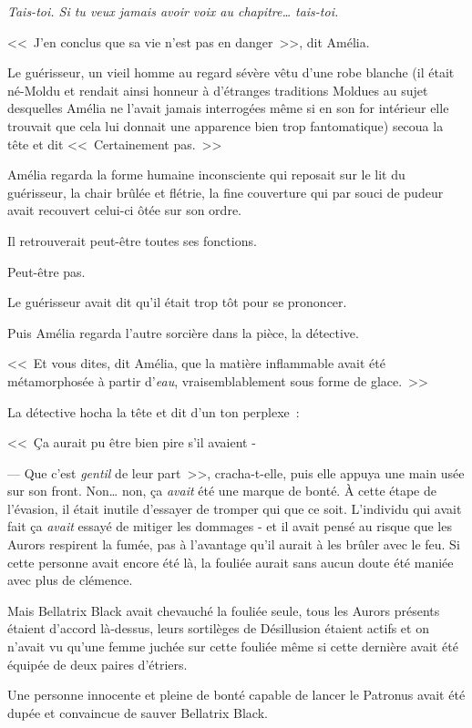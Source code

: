 \emph{Tais-toi. Si tu veux jamais avoir voix au chapitre… tais-toi.}


<<~J'en conclus que sa vie n'est pas en danger~>>, dit Amélia.

Le guérisseur, un vieil homme au regard sévère vêtu d'une robe blanche (il était né-Moldu et rendait ainsi honneur à d'étranges traditions Moldues au sujet desquelles Amélia ne l'avait jamais interrogées même si en son for intérieur elle trouvait que cela lui donnait une apparence bien trop fantomatique) secoua la tête et dit <<~Certainement pas.~>>

Amélia regarda la forme humaine inconsciente qui reposait sur le lit du guérisseur, la chair brûlée et flétrie, la fine couverture qui par souci de pudeur avait recouvert celui-ci ôtée sur son ordre.

Il retrouverait peut-être toutes ses fonctions.

Peut-être pas.

Le guérisseur avait dit qu'il était trop tôt pour se prononcer.

Puis Amélia regarda l'autre sorcière dans la pièce, la détective.

<<~Et vous dites, dit Amélia, que la matière inflammable avait été métamorphosée à partir d'\emph{eau}, vraisemblablement sous forme de glace.~>>

La détective hocha la tête et dit d'un ton perplexe~:

<<~Ça aurait pu être bien pire s'il avaient -

--- Que c'est \emph{gentil} de leur part~>>, cracha-t-elle, puis elle appuya une main usée sur son front. Non… non, ça \emph{avait} été une marque de bonté. À cette étape de l'évasion, il était inutile d'essayer de tromper qui que ce soit. L'individu qui avait fait ça \emph{avait} essayé de mitiger les dommages - et il avait pensé au risque que les Aurors respirent la fumée, pas à l'avantage qu'il aurait à les brûler avec le feu. Si cette personne avait encore été là, la fouliée aurait sans aucun doute été maniée avec plus de clémence.

Mais Bellatrix Black avait chevauché la fouliée seule, tous les Aurors présents étaient d'accord là-dessus, leurs sortilèges de Désillusion étaient actifs et on n'avait vu qu'une femme juchée sur cette fouliée même si cette dernière avait été équipée de deux paires d'étriers.

Une personne innocente et pleine de bonté capable de lancer le Patronus avait été dupée et convaincue de sauver Bellatrix Black.

